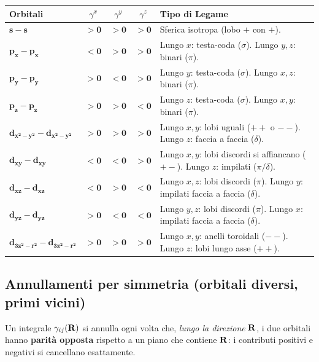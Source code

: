 \vspace{-0.2cm}
\begin{table}[htpb]
\centering
\renewcommand{\arraystretch}{1.3}
{\small
\begin{tabular}{l c c c l}
\toprule
Orbitali & $\gamma^x$ & $\gamma^y$ & $\gamma^z$ &  Tipo di Legame \\
\midrule
$\bm{s - s}$ & $\bm{> 0}$ & $\bm{> 0}$ & $\bm{> 0}$ & Sferica isotropa (lobo $+$ con $+$). \\
$\bm{p_x - p_x}$ & $\bm{< 0}$ & $\bm{> 0}$ & $\bm{> 0}$ & Lungo $x$: testa-coda ($\sigma$). Lungo $y,z$: binari ($\pi$). \\
$\bm{p_y - p_y}$ & $\bm{> 0}$ & $\bm{< 0}$ & $\bm{> 0}$ & Lungo $y$: testa-coda ($\sigma$). Lungo $x,z$: binari ($\pi$). \\
$\bm{p_z - p_z}$ & $\bm{> 0}$ & $\bm{> 0}$ & $\bm{< 0}$ & Lungo $z$: testa-coda ($\sigma$). Lungo $x,y$: binari ($\pi$). \\
$\bm{d_{x^2-y^2} - d_{x^2-y^2}}$ & $\bm{> 0}$ & $\bm{> 0}$ & $\bm{> 0}$ & Lungo $x,y$: lobi uguali ($++$ o $--$). Lungo $z$: faccia a faccia ($\delta$). \\
$\bm{d_{xy} - d_{xy}}$ & $\bm{< 0}$ & $\bm{< 0}$ & $\bm{> 0}$ & Lungo $x,y$: lobi discordi si affiancano ($+-$). Lungo $z$: impilati ($\pi/\delta$). \\
$\bm{d_{xz} - d_{xz}}$ & $\bm{< 0}$ & $\bm{> 0}$ & $\bm{< 0}$ & Lungo $x,z$: lobi discordi ($\pi$). Lungo $y$: impilati faccia a faccia ($\delta$). \\
$\bm{d_{yz} - d_{yz}}$ & $\bm{> 0}$ & $\bm{< 0}$ & $\bm{< 0}$ & Lungo $y,z$: lobi discordi ($\pi$). Lungo $x$: impilati faccia a faccia ($\delta$). \\
$\bm{d_{3z^2-r^2} - d_{3z^2-r^2}}$ & $\bm{> 0}$ & $\bm{> 0}$ & $\bm{> 0}$ & Lungo $x,y$: anelli toroidali ($--$). Lungo $z$: lobi lungo asse ($++$). \\
\bottomrule
\end{tabular}}
\end{table}


\subsection{Annullamenti per simmetria (orbitali diversi, primi vicini)}
Un integrale $\gamma_{ij}(\mathbf{R})$ si annulla ogni volta che, \emph{lungo la direzione} $\mathbf{R}$, i due orbitali hanno \textbf{parità opposta} rispetto a un piano che contiene $\mathbf{R}$: i contributi positivi e negativi si cancellano esattamente.

